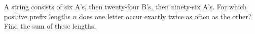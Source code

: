 A string consists of six A's, then twenty-four B's, then ninety-six A's. For which positive prefix lengths $n$ does one letter occur exactly twice as often as the other? Find the sum of these lengths.
